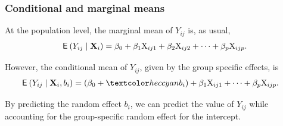 \documentclass{beamer}
\begin{document}


\begin{frame}
\frametitle{Conditional and marginal means}
\bi
\item At the population level, the marginal mean of $Y_{ij}$ is, as usual,
\begin{align*}
{\mathsf E}_{}\left(Y_{ij}\mid \mathbf{X}_i\right)=\beta_0  + \beta_1 \mathrm{X}_{ij1}+\beta_2\mathrm{X}_{ij2}+\cdots+\beta_p\mathrm{X}_{ijp}.
\end{align*}
\item However, the \alert{conditional mean} of $Y_{ij}$, given by the group specific effects, is
\begin{align*}
\E{Y_{ij}\mid \mathbf{X}_i, b_i}&=(\beta_0 + \alert{b_i}) + \beta_1 \mathrm{X}_{ij1}+\cdots+\beta_p\mathrm{X}_{ijp}.
\end{align*}
\item By predicting the random effect $b_i$, we can predict the value of $Y_{ij}$ while accounting for the group-specific random effect for the intercept.
\ei
\end{frame}
\end{document}
